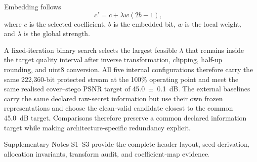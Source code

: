 Embedding follows
\begin{equation}
c' = c + \lambda w(2b-1),
\end{equation}
where \(c\) is the selected coefficient, \(b\) is the embedded bit, \(w\) is the local weight, and \(\lambda\) is the global strength.

A fixed-iteration binary search selects the largest feasible \(\lambda\) that remains inside the target quality interval after inverse transformation, clipping, half-up rounding, and uint8 conversion. All five internal configurations therefore carry the same 222,360-bit protected stream at the 100\% operating point and meet the same realised cover--stego PSNR target of \SI{45.0\pm0.1}{dB}. The external baselines carry the same declared raw-secret information but use their own frozen representations and choose the clean-valid candidate closest to the common 45.0~dB target. Comparisons therefore preserve a common declared information target while making architecture-specific redundancy explicit.

Supplementary Notes S1--S3 provide the complete header layout, seed derivation, allocation invariants, transform audit, and coefficient-map evidence.
